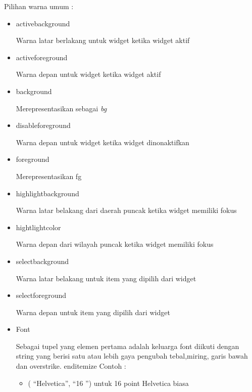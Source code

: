 \documentclass [12pt,a4paper,notitlepage,oneside,bahasa]{article}
\begin{document}
\begin{enumerate}
\vspace{12pt}
Pilihan warna umum :
\noindent 
\begin{itemize}
	\item activebackground \par
	Warna latar berlakang untuk widget ketika widget aktif \par
	\noindent 
	\item activeforeground \par
	Warna depan untuk widget ketika widget aktif \par
	\noindent 
	\item background \par
	Merepresentasikan sebagai \textit{bg} \par
	\noindent 
	\item disableforeground \par
	Warna depan untuk widget ketika widget dinonaktifkan \par
	\noindent 
	\item foreground \par
	Merepresentasikan fg \par
	\noindent 
	\item highlightbackground \par
	Warna latar belakang dari daerah puncak ketika widget memiliki fokus \par
	\noindent 
	\item hightlightcolor \par
	Warna depan dari wilayah puncak ketika widget memiliki fokus \par
	\noindent 
	\item selectbackground \par
	Warna latar belakang untuk item yang dipilih dari widget \par
	\noindent 
	\item selectforeground \par
	Warna depan untuk item yang dipilih dari widget \par
	\noindent 
	\item Font \par
	\noindent 
	Sebagai tupel yang elemen pertama adalah keluarga font diikuti dengan string yang berisi satu atau lebih gaya pengubah tebal,miring, garis bawah dan overstrike. 
	end{itemize}
	\noindent 
Contoh : \par
	\begin{itemize}
		\noindent
		\item ( ``Helvetica'', ``16 '') untuk 16 \- point Helvetica biasa \par

\end{itemize}
\end{itemize}
\end{enumerate}
\end{document}
